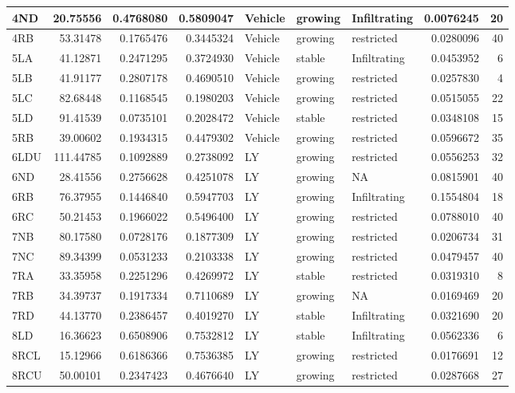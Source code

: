 \documentclass[
]{book}
\begin{document}
\begin{tabular}{l|r|r|r|l|l|l|r|r}
\hline
4ND & 20.75556 & 0.4768080 & 0.5809047 & Vehicle & growing & Infiltrating & 0.0076245 & 20\\
\hline
4RB & 53.31478 & 0.1765476 & 0.3445324 & Vehicle & growing & restricted & 0.0280096 & 40\\
\hline
5LA & 41.12871 & 0.2471295 & 0.3724930 & Vehicle & stable & Infiltrating & 0.0453952 & 6\\
\hline
5LB & 41.91177 & 0.2807178 & 0.4690510 & Vehicle & growing & restricted & 0.0257830 & 4\\
\hline
5LC & 82.68448 & 0.1168545 & 0.1980203 & Vehicle & growing & restricted & 0.0515055 & 22\\
\hline
5LD & 91.41539 & 0.0735101 & 0.2028472 & Vehicle & stable & restricted & 0.0348108 & 15\\
\hline
5RB & 39.00602 & 0.1934315 & 0.4479302 & Vehicle & growing & restricted & 0.0596672 & 35\\
\hline
6LDU & 111.44785 & 0.1092889 & 0.2738092 & LY & growing & restricted & 0.0556253 & 32\\
\hline
6ND & 28.41556 & 0.2756628 & 0.4251078 & LY & growing & NA & 0.0815901 & 40\\
\hline
6RB & 76.37955 & 0.1446840 & 0.5947703 & LY & growing & Infiltrating & 0.1554804 & 18\\
\hline
6RC & 50.21453 & 0.1966022 & 0.5496400 & LY & growing & restricted & 0.0788010 & 40\\
\hline
7NB & 80.17580 & 0.0728176 & 0.1877309 & LY & growing & restricted & 0.0206734 & 31\\
\hline
7NC & 89.34399 & 0.0531233 & 0.2103338 & LY & growing & restricted & 0.0479457 & 40\\
\hline
7RA & 33.35958 & 0.2251296 & 0.4269972 & LY & stable & restricted & 0.0319310 & 8\\
\hline
7RB & 34.39737 & 0.1917334 & 0.7110689 & LY & growing & NA & 0.0169469 & 20\\
\hline
7RD & 44.13770 & 0.2386457 & 0.4019270 & LY & stable & Infiltrating & 0.0321690 & 20\\
\hline
8LD & 16.36623 & 0.6508906 & 0.7532812 & LY & stable & Infiltrating & 0.0562336 & 6\\
\hline
8RCL & 15.12966 & 0.6186366 & 0.7536385 & LY & growing & restricted & 0.0176691 & 12\\
\hline
8RCU & 50.00101 & 0.2347423 & 0.4676640 & LY & growing & restricted & 0.0287668 & 27\\
\hline
\end{tabular}
\end{document}
